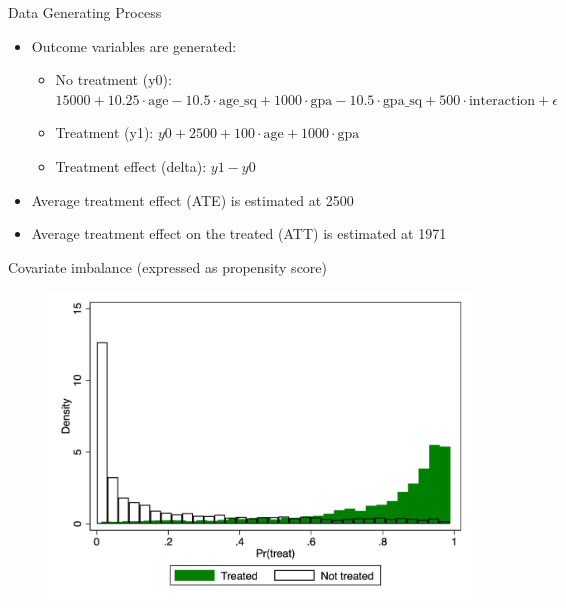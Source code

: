 \documentclass{beamer}
\begin{document}
\begin{frame}{Data Generating Process}
\begin{itemize}
\item Outcome variables are generated:
\begin{itemize}
\item No treatment (y0): $15000 + 10.25 \cdot \text{age} - 10.5 \cdot \text{age_sq} + 1000 \cdot \text{gpa} - 10.5 \cdot \text{gpa_sq} + 500 \cdot \text{interaction} + \epsilon$
\item Treatment (y1): $y0 + 2500 + 100 \cdot \text{age} + 1000 \cdot \text{gpa}$
\item Treatment effect (delta): $y1 - y0$
\end{itemize}
\item Average treatment effect (ATE) is estimated at 2500
\item Average treatment effect on the treated (ATT) is estimated at 1971
\end{itemize}
\end{frame}







\begin{frame}{Covariate imbalance (expressed as propensity score)}

\begin{figure}
\begin{center}
             \includegraphics[scale=0.1]{./lecture_includes/covariate_imbalance.jpg}
\end{center}
\end{figure}

\end{frame}
\end{document}
